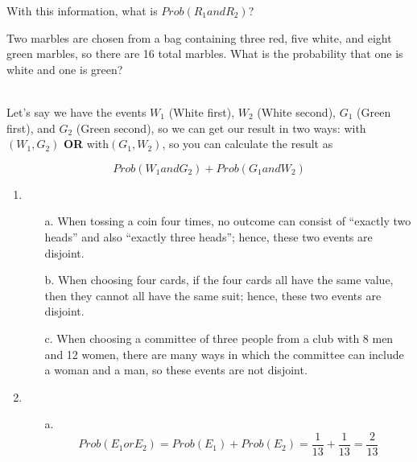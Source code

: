 {\begin{questionNOGRADE}{\thequestion}
        With this information, what is $Prob(R_{1} and R_{2})$?
    \end{questionNOGRADE}

    \newpage

    \begin{questionNOGRADE}{\thequestion}
            Two marbles are chosen from a bag containing three red, five white, and eight green marbles,
            so there are 16 total marbles.
            What is the probability that one is white and one is green?

            ~\\
            Let's say we have the events
            $W_{1}$ (White first), $W_{2}$ (White second), $G_{1}$ (Green first), and
            $G_{2}$ (Green second), so we can get our result in two ways: with
            $(W_{1}, G_{2})$ \textbf{OR} with$(G_{1}, W_{2})$, so you can calculate
            the result as

            $$Prob(W_{1} and G_{2}) + Prob(G_{1} and W_{2})$$
    \end{questionNOGRADE}

}{

    \begin{enumerate}
        \item
            \begin{itemize}
                \item[a.]   When tossing a coin four times, no outcome can
                            consist of ``exactly two heads'' and also ``exactly three heads'';
                            hence, these two events are disjoint.
                            
                \item[b.]   When choosing four cards, if the four cards all have
                            the same value, then they cannot all have the same suit; hence, these
                            two events are disjoint.
                            
                \item[c.]   When choosing a committee of three people
                            from a club with 8 men and 12 women, there are many ways in which
                            the committee can include a woman and a man,
                            so these events are not disjoint.
            \end{itemize}

        \item
            \begin{itemize}
                \item[a.]   $$Prob(E_{1} or E_{2}) = Prob(E_{1}) + Prob(E_{2}) = \frac{1}{13} + \frac{1}{13} = \frac{2}{13}$$


\end{itemize}
\end{enumerate}}
